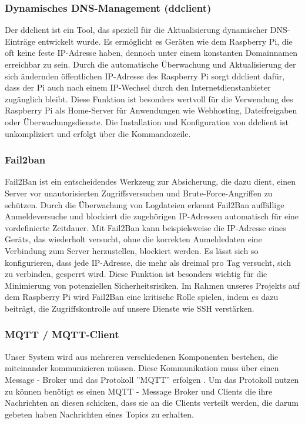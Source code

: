 \subsubsection{Dynamisches DNS-Management (ddclient)}
Der ddclient ist ein Tool, das speziell für die Aktualisierung dynamischer DNS-Einträge entwickelt wurde. Es ermöglicht es Geräten wie dem Raspberry Pi, die oft keine feste IP-Adresse haben, dennoch unter einem konstanten Domainnamen erreichbar zu sein. Durch die automatische Überwachung und Aktualisierung der sich ändernden öffentlichen IP-Adresse des Raspberry Pi sorgt ddclient dafür, dass der Pi auch nach einem IP-Wechsel durch den Internetdienstanbieter zugänglich bleibt. Diese Funktion ist besonders wertvoll für die Verwendung des Raspberry Pi als Home-Server für Anwendungen wie Webhosting, Dateifreigaben oder Überwachungsdienste. Die Installation und Konfiguration von ddclient ist unkompliziert und erfolgt über die Kommandozeile. \cite{ddclient}

\subsubsection{Fail2ban}
Fail2Ban ist ein entscheidendes Werkzeug zur Absicherung, die dazu dient, einen Server vor unautorisierten Zugriffsversuchen und Brute-Force-Angriffen zu schützen. Durch die Überwachung von Logdateien erkennt Fail2Ban auffällige Anmeldeversuche und blockiert die zugehörigen IP-Adressen automatisch für eine vordefinierte Zeitdauer. Mit Fail2Ban kann beispielsweise die IP-Adresse eines Geräts, das wiederholt versucht, ohne die korrekten Anmeldedaten eine Verbindung zum Server herzustellen, blockiert werden. Es lässt sich so konfigurieren, dass jede IP-Adresse, die mehr als dreimal pro Tag versucht, sich zu verbinden, gesperrt wird. \cite{Fail2ban} Diese Funktion ist besonders wichtig für die Minimierung von potenziellen Sicherheitsrisiken. Im Rahmen unseres Projekts auf dem Raspberry Pi wird Fail2Ban eine kritische Rolle spielen, indem es dazu beiträgt, die Zugriffskontrolle auf unsere Dienste wie SSH verstärken.

\subsubsection{MQTT / MQTT-Client}
Unser System wird aus mehreren verschiedenen Komponenten bestehen, die miteinander kommunizieren müssen. Diese Kommunikation muss über einen Message - Broker und das Protokoll ''MQTT'' erfolgen \cite{MQTT} . Um das Protokoll nutzen zu können benötigt es einen MQTT - Message Broker und Clients die ihre Nachrichten an diesen schicken, dass sie an die Clients verteilt werden, die darum gebeten haben Nachrichten eines Topics zu erhalten. 

